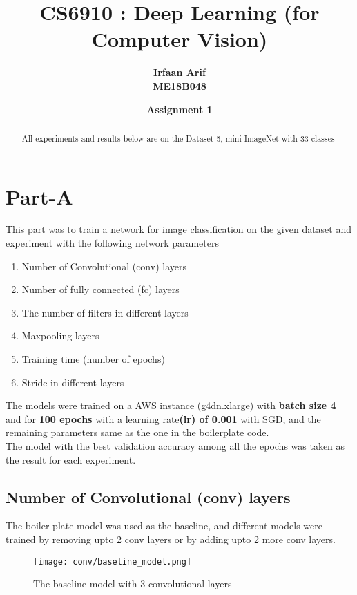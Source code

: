 \documentclass{article}
\title{CS6910 : Deep Learning (for Computer Vision)}
\author{\textbf{Irfaan Arif} \\ {\textbf{ME18B048}}}
\date{\textbf{Assignment 1}}
\begin{document}
\maketitle
\vspace{-2.6em}
\renewcommand{\abstractname}{\vspace{-\baselineskip}}
\begin{abstract}
    All experiments and results below are on the Dataset 5, mini-ImageNet with 33 classes 
\end{abstract}

\section{Part-A}
This part was to train a network for image classification on the given dataset and experiment with the following network parameters
\begin{enumerate}
    \item Number of Convolutional (conv) layers
    \item Number of fully connected (fc) layers
    \item The number of filters in different layers
    \item Maxpooling layers
    \item Training time (number of epochs)
    \item Stride in different layers
\end{enumerate}

\noindent
The models were trained on a AWS instance (g4dn.xlarge)  with \textbf{batch size 4} and for \textbf{100 epochs} with a learning rate\textbf{(lr) of 0.001} with SGD, and the remaining parameters same as the one in the boilerplate code. \\

\noindent
The model with the best validation accuracy among all the epochs was taken as the result for each experiment.

\subsection{Number of Convolutional (conv) layers}
The boiler plate model was used as the baseline, and different models were trained by removing upto 2 conv layers or by adding upto 2 more conv layers. \\

\begin{figure}[H]
    \centering
    \texttt{[image: conv/baseline\_model.png]}
    \caption{The baseline model with 3 convolutional layers}
    \label{fig:conv_base}
\end{figure}
\end{document}
